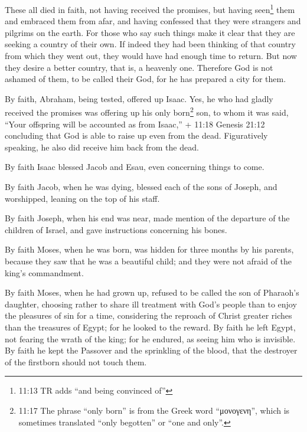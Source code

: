  These all died in faith, not having received the promises,
but having seen\footnote{11:13 TR adds ``and being convinced of''} them
and embraced them from afar, and having confessed that they were
strangers and pilgrims on the earth.  For those who say
such things make it clear that they are seeking a country of their own.
 If indeed they had been thinking of that country from
which they went out, they would have had enough time to return.
 But now they desire a better country, that is, a heavenly
one. Therefore God is not ashamed of them, to be called their God, for
he has prepared a city for them.

 By faith, Abraham, being tested, offered up Isaac. Yes, he
who had gladly received the promises was offering up his only
born\footnote{11:17 The phrase ``only born'' is from the Greek word
  ``μονογενη'', which is sometimes translated ``only begotten'' or ``one
  and only''.} son,  to whom it was said, ``Your offspring
will be accounted as from Isaac,'' + 11:18 Genesis 21:12 
concluding that God is able to raise up even from the dead. Figuratively
speaking, he also did receive him back from the dead.

 By faith Isaac blessed Jacob and Esau, even concerning
things to come.

 By faith Jacob, when he was dying, blessed each of the
sons of Joseph, and worshipped, leaning on the top of his staff.

 By faith Joseph, when his end was near, made mention of
the departure of the children of Israel, and gave instructions
concerning his bones.

 By faith Moses, when he was born, was hidden for three
months by his parents, because they saw that he was a beautiful child;
and they were not afraid of the king's commandment.

 By faith Moses, when he had grown up, refused to be called
the son of Pharaoh's daughter,  choosing rather to share
ill treatment with God's people than to enjoy the pleasures of sin for a
time,  considering the reproach of Christ greater riches
than the treasures of Egypt; for he looked to the reward. 
By faith he left Egypt, not fearing the wrath of the king; for he
endured, as seeing him who is invisible.  By faith he kept
the Passover and the sprinkling of the blood, that the destroyer of the
firstborn should not touch them.

